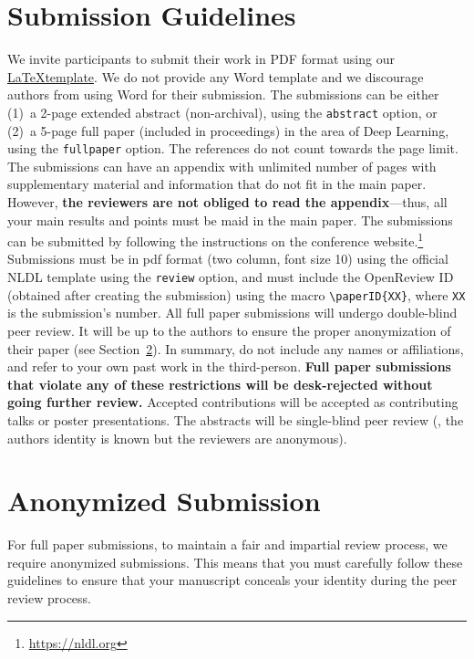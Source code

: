 \documentclass[abstract]{nldl}
\begin{document}
\section{Submission Guidelines}
We invite participants to submit their work in PDF format using our \href{https://github.com/SFI-Visual-Intelligence/nldl}{\LaTeX template}.
We do not provide any Word template and we discourage authors from using Word for their submission.
The submissions can be either (1)~a 2-page extended abstract (non-archival), using the \verb|abstract| option, or (2)~a 5-page full paper (included in proceedings) in the area of Deep Learning, using the \verb|fullpaper| option.
The references do not count towards the page limit.
The submissions can have an appendix with unlimited number of pages with supplementary material and information that do not fit in the main paper.
However, \textbf{the reviewers are not obliged to read the appendix}---thus, all your main results and points must be maid in the main paper.
The submissions can be submitted by following the instructions on the conference website.\footnote{\url{https://nldl.org}}
Submissions must be in pdf format (two column, font size 10) using the official NLDL template using the \verb|review| option, and must include the OpenReview ID (obtained after creating the submission) using the macro \verb|\paperID{XX}|, where \verb|XX| is the submission's number.
All full paper submissions will undergo double-blind peer review.
It will be up to the authors to ensure the proper anonymization of their paper (see Section~\ref{sec:anon}).
In summary, do not include any names or affiliations, and refer to your own past work in the third-person.
\textbf{Full paper submissions that violate any of these restrictions will be desk-rejected without going further review.}
Accepted contributions will be accepted as contributing talks or poster presentations.
The abstracts will be single-blind peer review (\ie, the authors identity is known but the reviewers are anonymous).

\section{Anonymized Submission}
\label{sec:anon}

For full paper submissions, to maintain a fair and impartial review process, we require anonymized submissions.
This means that you must carefully follow these guidelines to ensure that your manuscript conceals your identity during the peer review process.
\end{document}
